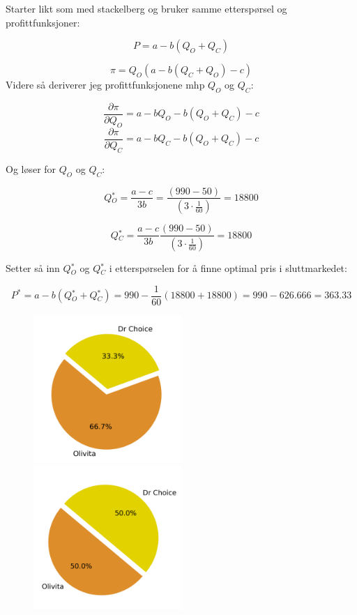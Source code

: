 \documentclass[
  12pt,
  a4paper,
  DIV=11,
  numbers=noendperiod]{scrartcl}
\begin{document}
Starter likt som med stackelberg og bruker samme etterspørsel og
profittfunksjoner:

\[P = a - b(Q_O+Q_C) \tag{10}\]

\[\pi = Q_O(a-b(Q_C+Q_O)-c) \tag{11}\] Videre så deriverer jeg
profittfunksjonene mhp \(Q_O\) og \(Q_C\):

\[\frac{\partial \pi}{\partial Q_O} = a -b Q_O - b(Q_O+Q_C) -c \tag{12}\]
\[\frac{\partial \pi}{\partial Q_C} = a -b Q_C - b(Q_O+Q_C) -c \tag{13}\]

Og løser for \(Q_O\) og \(Q_C\):

\[Q{_O^*} = \frac{a-c}{3b} = \frac{(990-50)}{(3 \cdot \frac{1}{60})} = 18800 \tag{14}\]

\[Q{_C^*} = \frac{a-c}{3b} \frac{(990-50)}{(3 \cdot \frac{1}{60})} = 18800 \tag{15}\]

Setter så inn \(Q{_O^*}\) og \(Q{_C^*}\) i etterspørselen for å finne
optimal pris i sluttmarkedet:

\[P^* = a - b(Q{_O^*}+Q{_C^*}) = 990 - \frac{1}{60}(18800+18800) = 990 - 626.666 = 363.33 \tag{16}\]

\begin{figure}
  \centering
  \includegraphics[width=0.5\textwidth]{dokumentobjekter/figurer/stackelberg_olivita_dr_choice.png}
  \label{fig:stackel_olivita_dr_choice}
  \includegraphics[width=0.5\textwidth]{dokumentobjekter/figurer/cournot_olivita_dr_choice.png}
  \label{fig:cournot_olivita_dr_choice}
  \vspace{-1cm}
\end{figure}
\end{document}
